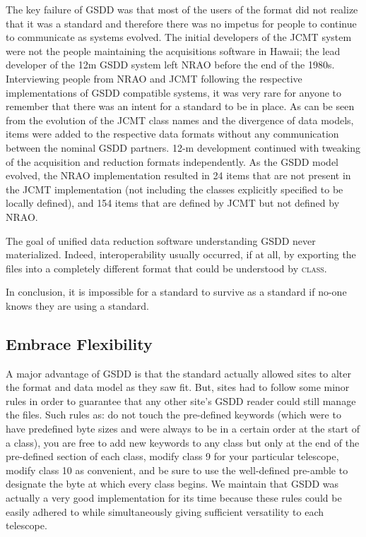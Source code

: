 \documentclass[final,authoryear,5p,times,twocolumn]{elsarticle}
\begin{document}
The key failure of GSDD was that most of the users of the format did
not realize that it was a standard and therefore there was no
impetus for people to continue to communicate as systems
evolved. The initial developers of the JCMT system were not the people
maintaining the acquisitions software in Hawaii; the lead developer of
the 12m GSDD system left NRAO before the end of the 1980s.
Interviewing people from NRAO and JCMT following the
respective implementations of GSDD compatible systems, it was very rare
for anyone to remember that there was an intent for a standard to be
in place. As can be seen from the evolution of the JCMT class names
and the divergence of data models, items were added to the respective
data formats without any communication between the nominal GSDD
partners. 12-m development continued with tweaking of the acquisition
and reduction formats independently.  As the GSDD model evolved, the
NRAO implementation resulted in 24 items that are not present in the
JCMT implementation (not including the classes explicitly specified to
be locally defined), and 154 items that are defined by JCMT but not
defined by NRAO.

The goal of unified data reduction software understanding GSDD never
materialized. Indeed, interoperability usually occurred, if at all, by exporting
the files into a completely different format that could be understood
by \textsc{class}.

In conclusion, it is impossible for a standard to survive as a standard
if no-one knows they are using a standard.

\subsection{Embrace Flexibility}

A major advantage of GSDD is that the standard actually allowed sites
to alter the format and data model as they saw fit.  But, sites had to
follow some minor rules in order to guarantee that any other site's
GSDD reader could still manage the files.  Such rules as: do not touch
the pre-defined keywords (which were to have predefined byte sizes and
were always to be in a certain order at the start of a class), you are
free to add new keywords to any class but only at the end of the
pre-defined section of each class, modify class 9 for your particular
telescope, modify class 10 as convenient, and be sure to
use the well-defined pre-amble to designate the byte at which every
class begins.  We maintain that GSDD was actually a very good
implementation for its time because these rules could be easily
adhered to while simultaneously giving sufficient versatility to each
telescope.
\end{document}
